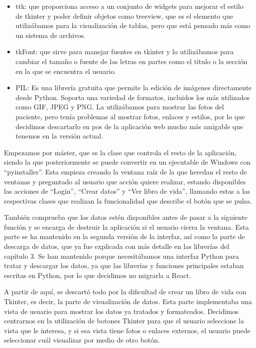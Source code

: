 	\begin{itemize}  
		\item ttk: que proporciona acceso a un conjunto de widgets para mejorar el estilo de tkinter y poder definir objetos como treeview, que es el elemento que utilizábamos para la visualización de tablas, pero que está pensado más como un sistema de archivos.
		
		\item tkFont: que sirve para manejar fuentes en tkinter y lo utilizábamos para cambiar el tamaño o fuente de las letras en partes como el título o la sección en la que se encuentra el usuario.
		
		\item PIL: Es una librería gratuita que permite la edición de imágenes directamente desde Python. Soporta una variedad de formatos, incluidos los más utilizados como GIF, JPEG y PNG. La utilizábamos para mostrar las fotos del paciente, pero tenía problemas al mostrar fotos, enlaces y estilos, por lo que decidimos descartarlo en pos de la aplicación web mucho más amigable que tenemos en la versión actual.
		
	\end{itemize}
		Empezamos por máster, que es la clase que controla el resto de la aplicación, siendo la que posteriormente se puede convertir en un ejecutable de Windows con ``pyinstaller''. Esta empieza creando la ventana raíz de la que heredan el resto de ventanas y preguntado al usuario que acción quiere realizar, estando disponibles las acciones de ``Login'', ``Crear datos'' y ``Ver libro de vida'', llamando estas a las respectivas clases que realizan la funcionalidad que describe el botón que se pulsa.
		
		También comprueba que los datos estén disponibles antes de pasar a la siguiente función y se encarga de destruir la aplicación si el usuario cierra la ventana. Esta parte se ha mantenido en la segunda versión de la interfaz, así como la parte de descarga de datos, que ya fue explicada con más detalle en las librerías del capítulo 3. Se han mantenido porque necesitábamos una interfaz Python para tratar y descargar los datos, ya que las librerías y funciones principales estaban escritas en Python, por lo que decidimos no migrarla a React.

A partir de aquí, se descartó todo por la dificultad de crear un libro de vida con Tkinter, es decir, la parte de visualización de datos. Esta parte implementaba una vista de usuario para mostrar los datos ya tratados y formateados. Decidimos centrarnos en la utilización de botones Tkinter para que el usuario seleccione la vista que le interesa, y si esa vista tiene fotos o enlaces externos, el usuario puede seleccionar cuál visualizar por medio de otro botón. 


